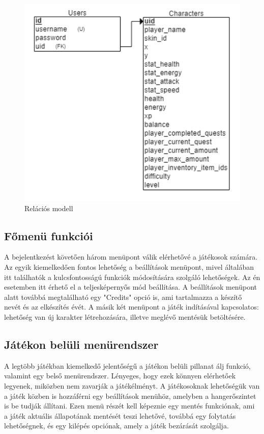 \begin{figure}[H]
    \centering
    \includegraphics[width=10.0truecm]{images/RelationModell.png}
    \caption{Relációs modell}
    \label{fig:Relációs modell}
\end{figure}

\subsection{Főmenü funkciói}

A bejelentkezést követően három menüpont válik elérhetővé a játékosok számára. Az egyik kiemelkedően fontos lehetőség a beállítások menüpont, mivel általában itt találhatók a kulcsfontosságú funkciók módosítására szolgáló lehetőségek. Az én esetemben itt érhető el a teljesképernyős mód beállítása. A beállítások menüpont alatt továbbá megtalálható egy "Credits" opció is, ami tartalmazza a készítő nevét és az elkészítés évét. A másik két menüpont a játék indításával kapcsolatos: lehetőség van új karakter létrehozására, illetve meglévő mentésük betöltésére.

\subsection{Játékon belüli menürendszer}

A legtöbb játékban kiemelkedő jelentőségű a játékon belüli pillanat álj funkció, valamint egy belső menürendszer. Lényeges, hogy ezek könnyen elérhetőek legyenek, miközben nem zavarják a játékélményt. A játékosoknak lehetőségük van a játék közben is hozzáférni egy beállítások menühöz, amelyben a hangerőszintet is be tudják állítani. Ezen menü részét kell képeznie egy mentés funkciónak, ami a játék aktuális állapotának mentését teszi lehetővé, továbbá egy folytatás lehetőségnek, és egy kilépés opciónak, amely a játék bezárását szolgálja.


